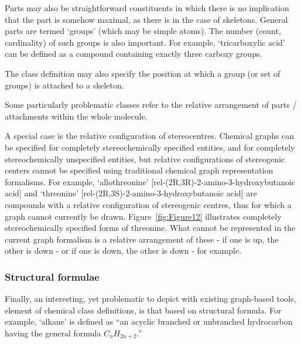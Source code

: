 \documentclass[10pt]{bmc_article}
\newenvironment{bmcformat}{\baselineskip20pt\sloppy\setboolean{publ}{false}}{\baselineskip20pt\sloppy}
\begin{document}
\begin{bmcformat}
Parts may also be straightforward constituents in which there is no implication that the part is somehow maximal, as there is in the case of skeletons.  General parts are termed `groups' (which may be simple atoms). The number (count, cardinality) of such groups is also important.  For example, `tricarboxylic acid' can be defined as a compound containing exactly three carboxy groups. 


The class definition may also specify the position at which a group (or set of groups) is attached to a skeleton. 

Some particularly problematic classes refer to the relative arrangement of parts / attachments within the whole molecule. 

A special case is the relative configuration of stereocentres. Chemical graphs can be specified for completely stereochemically specified entities, and for completely stereochemically unspecified entities, but relative configurations of stereogenic centers cannot be specified using traditional chemical graph representation formalisms. For example, `allothreonine' [rel-(2R,3R)-2-amino-3-hydroxybutanoic acid] and `threonine' [rel-(2R,3S)-2-amino-3-hydroxybutanoic acid] are compounds with a relative configuration of stereogenic centres, thus for which a graph cannot currently be drawn. Figure~\ref{fig:Figure12} illustrates completely stereochemically specified forms of threonine. What cannot be represented in the current graph formalism is a relative arrangement of these - if one is up, the other is down - or if one is down, the other is down - for example. 




\subsubsection*{Structural formulae}
\label{sec:molformula}

Finally, an interesting, yet problematic to depict with existing graph-based tools, element of chemical class definitions, is that based on structural formula. For example, `alkane' is defined as ``an acyclic branched or unbranched hydrocarbon having the general formula $C_{n}H_{2n+2}$.'' 





\end{bmcformat}
\end{document}
